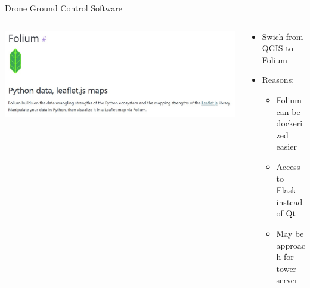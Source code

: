 \begin{frame}{Drone Ground Control Software}
    \begin{columns}
        \begin{column}{0.5\textwidth}
            \includegraphics[height=0.7\textheight,width=\textwidth,keepaspectratio]{images/rtt/Screenshot 2024-09-27 170105.jpg}
        \end{column}
        \begin{column}{0.5\textwidth}
            \begin{itemize}
                \item Swich from QGIS to Folium
                \item Reasons:
                \begin{itemize}
                    \item Folium can be dockerized easier
                    \item Access to Flask instead of Qt
                    \item May be approach for tower server
                \end{itemize}
            \end{itemize}
        \end{column}
    \end{columns}
\end{frame}

